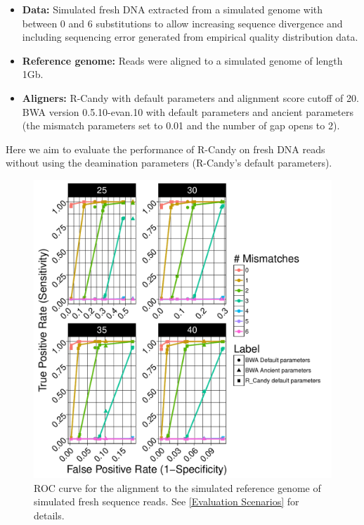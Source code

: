 \documentclass[11pt,a4paper]{report}
\begin{document}
  \begin{itemize}

   \item \textbf{Data:} Simulated fresh DNA extracted from a simulated genome 
   with between 0 and 6 substitutions to allow increasing sequence divergence
   and including sequencing error generated from empirical quality distribution data.
 
   
   \item \textbf{Reference genome:} Reads were aligned to a simulated genome of 
length 1Gb.

    \item \textbf{Aligners:} 
R-Candy with default parameters and alignment score cutoff of 20. \\
BWA version 0.5.10-evan.10 with default parameters and ancient parameters 
(the mismatch parameters set to
0.01 and the number of gap opens to 2)\cite{green2010draft}.

  \end{itemize}
 
Here we aim to evaluate the performance of R-Candy on fresh DNA reads 
without using the deamination parameters (R-Candy's default parameters).

\begin{figure}[H]
\centering
\includegraphics[width=12cm]{pictures/ROC_DS3_emp.pdf}

\caption{
ROC curve for the alignment to the simulated reference genome of simulated 
fresh sequence reads. See \ref{Evaluation Scenarios} for details.}

\label{DS3_emp}
\end{figure}
\end{document}
